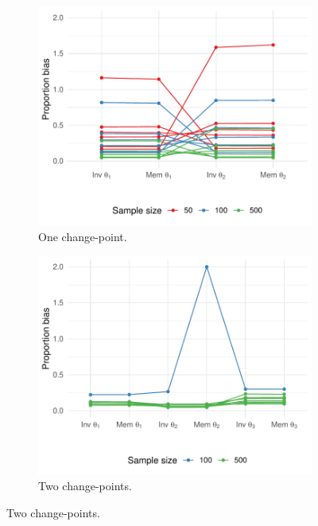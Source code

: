 \begin{appendix}
\begin{figure}[ht]
    \centering
     \begin{subfigure}[b]{0.45\textwidth}
         \centering
         \includegraphics[width=\textwidth]{exp1_tplot.pdf}
         \caption{One change-point.}
         \label{fig:exp1tplot}
     \end{subfigure}
     \hfill
    \begin{subfigure}[b]{0.45\textwidth}
         \centering
         \includegraphics[width=\textwidth]{exp2_tplot.pdf}
         \caption{Two change-points.}
         \label{fig:exp2tplot}
     \end{subfigure}

\end{figure}
\end{appendix}
